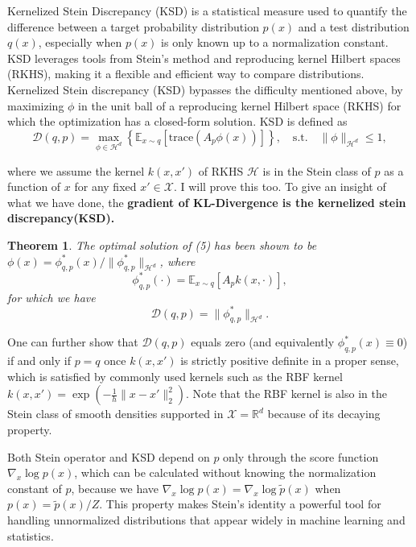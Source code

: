 \documentclass{article}
\newtheorem{theorem}{Theorem}[section] %
\begin{document}
Kernelized Stein Discrepancy (KSD) is a statistical measure used to quantify the difference between a target probability distribution $p(x)$ and a test distribution $q(x)$, especially when $p(x)$ is only known up to a normalization constant. KSD leverages tools from Stein's method and reproducing kernel Hilbert spaces (RKHS), making it a flexible and efficient way to compare distributions.
Kernelized Stein discrepancy (KSD) bypasses the difficulty mentioned above, by maximizing $\phi$ in the unit ball of a reproducing kernel Hilbert space (RKHS) for which the optimization has a closed-form solution. KSD is defined as
\begin{equation}
\mathcal{D}(q, p) = \max_{\phi \in \mathcal{H}^d} \left\{ \mathbb{E}_{x \sim q} [\text{trace}(A_p \phi(x))] \right\}, \quad \text{s.t.} \quad \|\phi\|_{\mathcal{H}^d} \leq 1,    
\end{equation}

where we assume the kernel $k(x, x')$ of RKHS $\mathcal{H}$ is in the Stein class of $p$ as a function of $x$ for any fixed $x' \in \mathcal{X}$. I will prove this too. To give an insight of what we have done, the \textbf{gradient of KL-Divergence is the kernelized stein discrepancy(KSD).}
\begin{tcolorbox}
\begin{theorem}
The optimal solution of (5) has been shown to be $\phi(x) = \phi_{q,p}^*(x)/\|\phi_{q,p}^*\|_{\mathcal{H}^d}$, where
\[
\phi_{q,p}^*(\cdot) = \mathbb{E}_{x \sim q}[A_p k(x, \cdot)],
\]
for which we have
\begin{equation}
    \mathcal{D}(q, p) = \|\phi_{q,p}^*\|_{\mathcal{H}^d}.
\end{equation}
    
\end{theorem}    
\end{tcolorbox}

One can further show that $\mathcal{D}(q, p)$ equals zero (and equivalently $\phi_{q,p}^*(x) \equiv 0$) if and only if $p = q$ once $k(x, x')$ is strictly positive definite in a proper sense, which is satisfied by commonly used kernels such as the RBF kernel $k(x, x') = \exp\left(-\frac{1}{h}\|x - x'\|_2^2\right)$. Note that the RBF kernel is also in the Stein class of smooth densities supported in $\mathcal{X} = \mathbb{R}^d$ because of its decaying property.

Both Stein operator and KSD depend on $p$ only through the score function $\nabla_x \log p(x)$, which can be calculated without knowing the normalization constant of $p$, because we have $\nabla_x \log p(x) = \nabla_x \log \tilde{p}(x)$ when $p(x) = \tilde{p}(x)/Z$. This property makes Stein's identity a powerful tool for handling unnormalized distributions that appear widely in machine learning and statistics.
\end{document}

